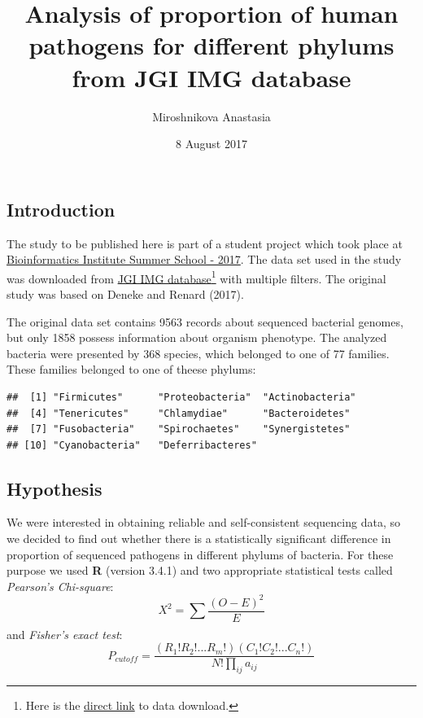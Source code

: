 \documentclass[]{article}
\title{Analysis of proportion of human pathogens for different phylums from JGI
IMG database}
\author{Miroshnikova Anastasia}
\date{8 August 2017}
\let\rmarkdownfootnote\footnote%
\def\footnote{\protect\rmarkdownfootnote}
\begin{document}
\maketitle

{
\hypersetup{linkcolor=black}
\setcounter{tocdepth}{2}
\tableofcontents
}
\subsection{Introduction}\label{introduction}

The study to be published here is part of a student project which took
place at
\href{http://bioinformaticsinstitute.ru/summer2017}{Bioinformatics
Institute Summer School - 2017}. The data set used in the study was
downloaded from \href{https://img.jgi.doe.gov/cgi-bin/m/main.cgi}{JGI
IMG database}\footnote{Here is the
  \href{https://raw.githubusercontent.com/Miffka/RAnalysis2FinalTask/master/IMG_all-more\%2Bpathog.xls}{direct
  link} to data download.} with multiple filters. The original study was
based on Deneke and Renard (2017).

The original data set contains 9563 records about sequenced bacterial
genomes, but only 1858 possess information about organism phenotype. The
analyzed bacteria were presented by 368 species, which belonged to one
of 77 families. These families belonged to one of theese phylums:

\begin{verbatim}
##  [1] "Firmicutes"      "Proteobacteria"  "Actinobacteria" 
##  [4] "Tenericutes"     "Chlamydiae"      "Bacteroidetes"  
##  [7] "Fusobacteria"    "Spirochaetes"    "Synergistetes"  
## [10] "Cyanobacteria"   "Deferribacteres"
\end{verbatim}

\subsection{Hypothesis}\label{hypothesis}

We were interested in obtaining reliable and self-consistent sequencing
data, so we decided to find out whether there is a statistically
significant difference in proportion of sequenced pathogens in different
phylums of bacteria. For these purpose we used \textbf{R} (version
3.4.1) and two appropriate statistical tests called \emph{Pearson's
Chi-square}: \[X^2 = \sum_{}{}\frac{(O - E)^2}{E} \] and \emph{Fisher's
exact test}:
\[P_{cutoff} = \frac{(R_1!R_2!...R_m!)(C_1!C_2!...C_n!)}{N!\prod_{ij}^{}a_{ij}} \]
\end{document}
